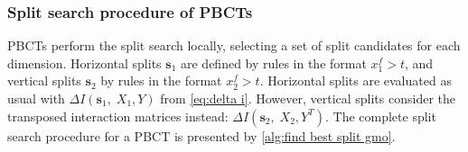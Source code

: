 \documentclass[sn-mathphys-num]{sn-jnl}%
\newcommand{\T}{^T}
\theoremstyle{thmstyleone}%
\theoremstyle{thmstyletwo}%
\theoremstyle{thmstylethree}%
\begin{document}
\subsubsection{Split search procedure of PBCTs}
\label{sec:pbct split search}

PBCTs perform the split search locally, selecting a set of split candidates for each dimension. Horizontal splits $\mathbf{s}_1$ are defined by rules in the format $x_1^f > t$, and vertical splits $\mathbf{s}_2$ by rules in the format $x_2^f > t$. Horizontal splits are evaluated as usual with $\Delta I (\mathbf{s}_1,\;X_1, Y)$ from \autoref{eq:delta i}.
%
%
However, vertical splits consider the transposed interaction matrices instead: $\Delta I (\mathbf{s}_2,\;X_2, Y\T)$.
%
The complete split search procedure for a PBCT is presented by \autoref{alg:find best split gmo}.
\end{document}
